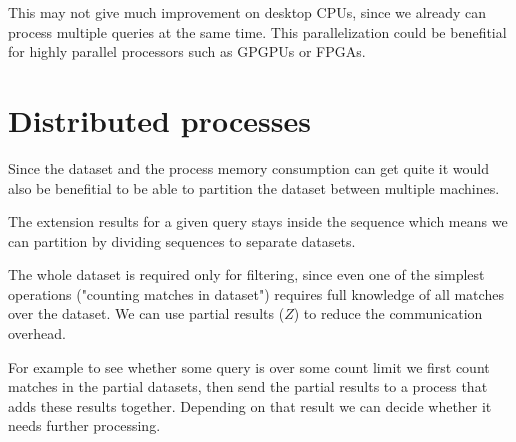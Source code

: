 This may not give much improvement on desktop CPUs, since we already can process multiple queries at the same time. This parallelization could be benefitial for highly parallel processors such as GPGPUs or FPGAs.

\section{Distributed processes}

Since the dataset and the process memory consumption can get quite it would also be benefitial to be able to partition the dataset between multiple machines.

The extension results for a given query stays inside the sequence which means we can partition by dividing sequences to separate datasets.

The whole dataset is required only for filtering, since even one of the simplest operations ("counting matches in dataset") requires full knowledge of all matches over the dataset. We can use partial results ($Z$) to reduce the communication overhead.

\begin{figure}[H]
	
\end{figure}

For example to see whether some query is over some count limit we first count matches in the partial datasets, then send the partial results to a process that adds these results together. Depending on that result we can decide whether it needs further processing.
